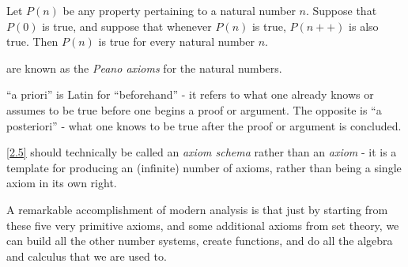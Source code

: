 \begin{ax}\label{2.5}
  Let \(P(n)\) be any property pertaining to a natural number \(n\).
  Suppose that \(P(0)\) is true, and suppose that whenever \(P(n)\) is true, \(P(n++)\) is also true.
  Then \(P(n)\) is true for every natural number \(n\).
\end{ax}

\begin{note}
   are known as the \emph{Peano axioms} for the natural numbers.
\end{note}

\begin{note}
  ``a priori'' is Latin for ``beforehand''
  - it refers to what one already knows or assumes to be true before one begins a proof or argument.
  The opposite is ``a posteriori''
  - what one knows to be true after the proof or argument is concluded.
\end{note}

\begin{note}
  \cref{2.5} should technically be called an \emph{axiom schema} rather than an \emph{axiom}
  - it is a template for producing an (infinite) number of axioms, rather than being a single axiom in its own right.
\end{note}

\begin{note}
  A remarkable accomplishment of modern analysis is that just by starting from these five very primitive axioms, and some additional axioms from set theory, we can build all the other number systems, create functions, and do all the algebra and calculus that we are used to.
\end{note}